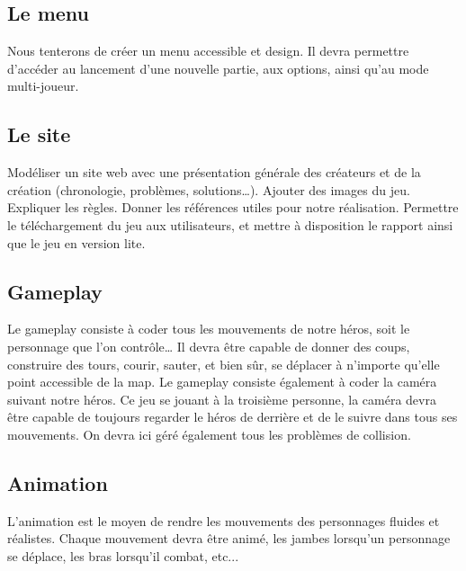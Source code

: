 \documentclass[a4paper, 12pt]{article}
\begin{document}
	\subsection{Le menu}
	Nous tenterons de créer un menu accessible et design. Il devra permettre d'accéder au lancement d’une nouvelle partie, aux options, ainsi qu’au mode multi-joueur. 
	\subsection{Le site}
	Modéliser un site web avec une présentation générale des créateurs et de la création (chronologie, problèmes, solutions…). Ajouter des images du jeu. Expliquer les règles.  Donner les références utiles pour notre réalisation. Permettre le téléchargement du jeu aux utilisateurs, et mettre à disposition le rapport ainsi que le jeu en version lite.
	\subsection{Gameplay}
	Le gameplay consiste à coder tous les mouvements de notre héros, soit le personnage que l’on contrôle… Il devra être capable de donner des coups, construire des tours, courir, sauter, et bien sûr, se déplacer à n’importe qu’elle point accessible de la map. Le gameplay consiste également à coder la caméra suivant notre héros. Ce jeu se jouant à la troisième personne, la caméra devra être capable de toujours regarder le héros de derrière et de le suivre dans tous ses mouvements. On devra ici géré également tous les problèmes de collision.
	\subsection{Animation}
	L’animation est le moyen de rendre les mouvements des personnages fluides et réalistes. Chaque mouvement devra être animé, les jambes lorsqu’un personnage se déplace, les bras lorsqu’il combat, etc...

\newpage
\end{document}
